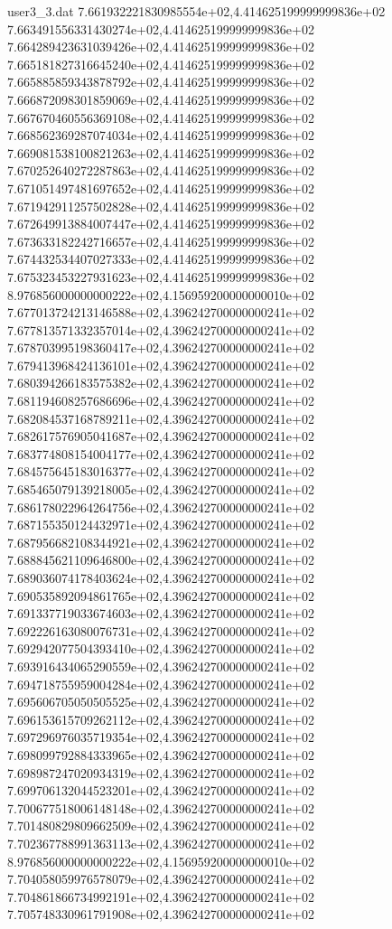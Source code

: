 \begin{filecontents}{user3_3.dat}
7.661932221830985554e+02,4.414625199999999836e+02
7.663491556331430274e+02,4.414625199999999836e+02
7.664289423631039426e+02,4.414625199999999836e+02
7.665181827316645240e+02,4.414625199999999836e+02
7.665885859343878792e+02,4.414625199999999836e+02
7.666872098301859069e+02,4.414625199999999836e+02
7.667670460556369108e+02,4.414625199999999836e+02
7.668562369287074034e+02,4.414625199999999836e+02
7.669081538100821263e+02,4.414625199999999836e+02
7.670252640272287863e+02,4.414625199999999836e+02
7.671051497481697652e+02,4.414625199999999836e+02
7.671942911257502828e+02,4.414625199999999836e+02
7.672649913884007447e+02,4.414625199999999836e+02
7.673633182242716657e+02,4.414625199999999836e+02
7.674432534407027333e+02,4.414625199999999836e+02
7.675323453227931623e+02,4.414625199999999836e+02
8.976856000000000222e+02,4.156959200000000010e+02
7.677013724213146588e+02,4.396242700000000241e+02
7.677813571332357014e+02,4.396242700000000241e+02
7.678703995198360417e+02,4.396242700000000241e+02
7.679413968424136101e+02,4.396242700000000241e+02
7.680394266183575382e+02,4.396242700000000241e+02
7.681194608257686696e+02,4.396242700000000241e+02
7.682084537168789211e+02,4.396242700000000241e+02
7.682617576905041687e+02,4.396242700000000241e+02
7.683774808154004177e+02,4.396242700000000241e+02
7.684575645183016377e+02,4.396242700000000241e+02
7.685465079139218005e+02,4.396242700000000241e+02
7.686178022964264756e+02,4.396242700000000241e+02
7.687155350124432971e+02,4.396242700000000241e+02
7.687956682108344921e+02,4.396242700000000241e+02
7.688845621109646800e+02,4.396242700000000241e+02
7.689036074178403624e+02,4.396242700000000241e+02
7.690535892094861765e+02,4.396242700000000241e+02
7.691337719033674603e+02,4.396242700000000241e+02
7.692226163080076731e+02,4.396242700000000241e+02
7.692942077504393410e+02,4.396242700000000241e+02
7.693916434065290559e+02,4.396242700000000241e+02
7.694718755959004284e+02,4.396242700000000241e+02
7.695606705050505525e+02,4.396242700000000241e+02
7.696153615709262112e+02,4.396242700000000241e+02
7.697296976035719354e+02,4.396242700000000241e+02
7.698099792884333965e+02,4.396242700000000241e+02
7.698987247020934319e+02,4.396242700000000241e+02
7.699706132044523201e+02,4.396242700000000241e+02
7.700677518006148148e+02,4.396242700000000241e+02
7.701480829809662509e+02,4.396242700000000241e+02
7.702367788991363113e+02,4.396242700000000241e+02
8.976856000000000222e+02,4.156959200000000010e+02
7.704058059976578079e+02,4.396242700000000241e+02
7.704861866734992191e+02,4.396242700000000241e+02
7.705748330961791908e+02,4.396242700000000241e+02

\end{filecontents}
